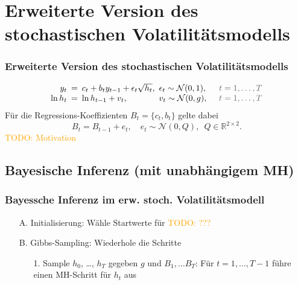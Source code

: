 \documentclass[10pt]{beamer}
\theoremstyle{definition}
\newcommand{\R}{\mathbb{R}} %
\newcommand{\Normal}{\mathcal{N}} %
\newcommand{\TODO}[1]{\textcolor{orange}{TODO: #1}}
\newcommand{\typeInfo}[1]{\textcolor{TypeInfoColor}{#1}}
\begin{document}
\section[Erweitertes stoch. Volatilitätsmodell]{Erweiterte Version des stochastischen Volatilitätsmodells}

\begin{frame}
  \frametitle{Erweiterte Version des stochastischen Volatilitätsmodells}
  \[
    \arraycolsep=2.5pt
    \begin{array}{rclll}
      y_t &=& c_t + b_t y_{t-1} + \epsilon_t \sqrt{h_t}, & \epsilon_t \sim \Normal(0, 1), & \quad \typeInfo{t = 1, \ldots, T} \\
      \ln h_t &=& \ln h_{t-1} + v_t, & v_t \sim \Normal(0, g), & \quad \typeInfo{t = 1, \ldots, T}
    \end{array}
  \]
  Für die Regressions-Koeffizienten $B_t = \{ c_t, b_t \}$ gelte dabei
  \[
    B_t = B_{t-1} + e_t, \quad e_t \sim \Normal(0, Q), \enspace Q \in \R^{2 \times 2}.
  \]
  \TODO{Motivation}
\end{frame}

\subsection{Bayesische Inferenz (mit unabhängigem MH)}

\begin{frame}[t]
  \frametitle{Bayessche Inferenz im erw. stoch. Volatilitätsmodell}
  \begin{enumerate}
    \item[A.] Initialisierung: Wähle Startwerte für \TODO{???}
    \item[B.] Gibbs-Sampling: Wiederhole die Schritte
    \begin{enumerate}
      \item[1.] Sample $h_0$, \ldots, $h_T$ gegeben $g$ und $B_1, \ldots B_T$:
      Für $t = 1, \ldots, T-1$ führe einen MH-Schritt für $h_t$ aus
    \end{enumerate}
  \end{enumerate}
\end{frame}
\end{document}
